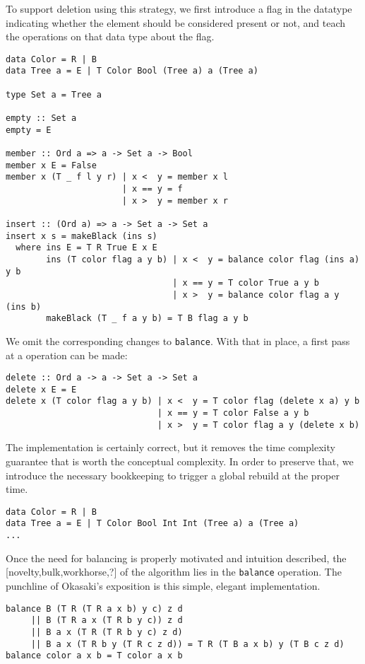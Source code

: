 \documentclass[preprint]{sigplanconf}
\begin{document}
To support deletion using this strategy, we first introduce a flag in the datatype indicating whether the element should be considered present or not, and teach the operations on that data type about the flag.
\begin{verbatim}
data Color = R | B
data Tree a = E | T Color Bool (Tree a) a (Tree a)

type Set a = Tree a

empty :: Set a
empty = E

member :: Ord a => a -> Set a -> Bool
member x E = False
member x (T _ f l y r) | x <  y = member x l
                       | x == y = f
                       | x >  y = member x r 

insert :: (Ord a) => a -> Set a -> Set a
insert x s = makeBlack (ins s)
  where ins E = T R True E x E
        ins (T color flag a y b) | x <  y = balance color flag (ins a) y b
                                 | x == y = T color True a y b
                                 | x >  y = balance color flag a y (ins b)
        makeBlack (T _ f a y b) = T B flag a y b
\end{verbatim}
We omit the corresponding changes to \texttt{balance}. With that in place, a first pass at a \cite{delete} operation can be made:
\begin{verbatim}
delete :: Ord a -> a -> Set a -> Set a
delete x E = E
delete x (T color flag a y b) | x <  y = T color flag (delete x a) y b
                              | x == y = T color False a y b
                              | x >  y = T color flag a y (delete x b)
\end{verbatim}
The implementation is certainly correct, but it removes the time complexity guarantee that is worth the conceptual complexity. In order to preserve that, we introduce the necessary bookkeeping to trigger a global rebuild at the proper time.
\begin{verbatim}
data Color = R | B
data Tree a = E | T Color Bool Int Int (Tree a) a (Tree a)
...
\end{verbatim}
Once the need for balancing is properly motivated and intuition described, the [novelty,bulk,workhorse,?] of the algorithm lies in the \texttt{balance} operation. The punchline of Okasaki's exposition is this simple, elegant implementation.
\begin{verbatim}
balance B (T R (T R a x b) y c) z d
     || B (T R a x (T R b y c)) z d
     || B a x (T R (T R b y c) z d)
     || B a x (T R b y (T R c z d)) = T R (T B a x b) y (T B c z d)
balance color a x b = T color a x b
\end{verbatim}
\end{document}
